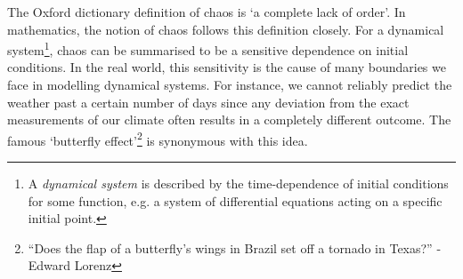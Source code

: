 The Oxford dictionary definition of chaos is `a complete lack of order'. In mathematics, the notion of chaos follows this definition closely. For a dynamical system\footnote{A \emph{dynamical system} is described by the time-dependence of initial conditions for some function, e.g. a system of differential equations acting on a specific initial point.}, chaos can be summarised to be a sensitive dependence on initial conditions. In the real world, this sensitivity is the cause of many boundaries we face in modelling dynamical systems. For instance, we cannot reliably predict the weather past a certain number of days since any deviation from the exact measurements of our climate often results in a completely different outcome. The famous `butterfly effect'\footnote{“Does the flap of a butterfly's wings in Brazil set off a tornado in Texas?” - Edward Lorenz} is synonymous with this idea.

